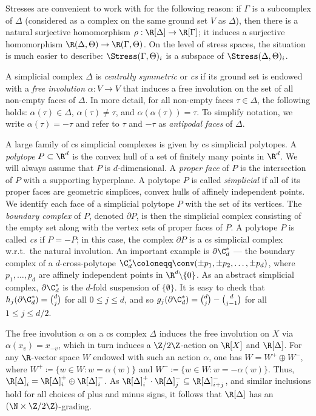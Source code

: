 Stresses are convenient to work with for the following reason: if $\Gamma$ is a subcomplex of $\Delta$ (considered as a complex on the same ground set $V$ as $\Delta$), then there is a natural surjective homomorphism $\rho:\R[\Delta] \to \R[\Gamma]$; it induces a surjective homomorphism $\R(\Delta,\Theta) \to \R(\Gamma,\Theta)$. On the level of stress spaces, the situation is much easier to describe: $\Stress(\Gamma,\Theta)_i$ is a subspace of $\Stress(\Delta,\Theta)_i$.

A simplicial complex $\Delta$ is \emph{centrally symmetric} or \emph{cs} if its ground set is endowed with a \emph{free involution} $\alpha: V \rightarrow V$ that induces a free involution on the set of all non-empty faces of $\Delta$. In more detail, for all non-empty faces $\tau \in \Delta$, the following holds: $\alpha(\tau)\in\Delta$, $\alpha(\tau)\neq \tau$, and $\alpha(\alpha(\tau))=\tau$. To simplify notation, we write $\alpha(\tau)=-\tau$ and refer to $\tau$ and $-\tau$ as \emph{antipodal faces} of $\Delta$. 

A large family of cs simplicial complexes is given by cs simplicial polytopes. A \emph{polytope} $P\subset \R^d$ is the convex hull of a set of finitely many points in $\R^d$. We will always assume that $P$ is $d$-dimensional. A \emph{proper face} of $P$ is the intersection of $P$ with a supporting hyperplane. A polytope $P$ is called \emph{simplicial} if all of its proper faces are geometric simplices, \ie convex hulls of affinely independent points. We identify each face of a simplicial polytope $P$ with the set of its vertices. The \emph{boundary complex} of $P$, denoted $\partial P$, is then the simplicial complex consisting of the empty set along with the vertex sets of proper faces of $P$. A polytope $P$ is called \emph{cs} if $P=-P$; in this case, the complex $\partial P$ is a cs simplicial complex w.r.t.~the natural involution. An important example is $\partial\C^*_d$ --- the boundary complex of a $d$-cross-polytope $\C^*_d\coloneqq \conv(\pm p_1,\pm p_2,\ldots, \pm p_d)$, where $p_1,\ldots,p_d$ are affinely independent points in $\R^d\backslash\{0\}$. As an abstract simplicial complex, $\partial\C^*_d$ is the $d$-fold suspension of $\{\emptyset\}$. It is easy to check that $h_j(\partial \C_d^*)=\binom{d}{j}$ for all $0\leq j\leq d$, and so $g_j(\partial \C_d^*)=\binom{d}{j}-\binom{d}{j-1}$ for all $1\leq j\leq d/2$.


The free involution $\alpha$ on a cs complex $\Delta$ induces the free involution on $X$ via $\alpha(x_v)=x_{-v}$, which in turn induces a $\Z/2\Z$-action on $\R[X]$ and $\R[\Delta]$. For any $\R$-vector space $W$ endowed with such an action $\alpha$, one has $W=W^+\oplus W^-$, where $W^+\coloneqq \{w\in W: w=\alpha(w)\}$ and $W^-\coloneqq \{w\in W: w=-\alpha(w)\}$. Thus,
$\R[\Delta]_i=\R[\Delta]^+_i\oplus \R[\Delta]^-_i$. As $\R[\Delta]^+_{i}\cdot\R[\Delta]^-_j \subseteq \R[\Delta]^{-}_{i+j}$, and similar inclusions hold for all choices of plus and minus signs, it follows that $\R[\Delta]$ has an $(\N\times \Z/2\Z)$-grading. 

